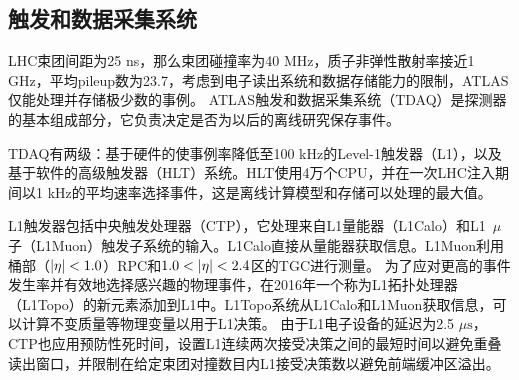 \subsection{触发和数据采集系统}
LHC束团间距为25 ns，那么束团碰撞率为40 MHz，质子非弹性散射率接近1 GHz，平均pileup数为23.7，考虑到电子读出系统和数据存储能力的限制，ATLAS仅能处理并存储极少数的事例。
ATLAS触发和数据采集系统（TDAQ）\cite{Aaboud2017}是探测器的基本组成部分，它负责决定是否为以后的离线研究保存事件。

TDAQ有两级：基于硬件的使事例率降低至100 kHz的Level-1触发器（L1），以及基于软件的高级触发器（HLT）系统。HLT使用4万个CPU，并在一次LHC注入期间以1 kHz的平均速率选择事件，这是离线计算模型和存储可以处理的最大值。

L1触发器包括中央触发处理器（CTP），它处理来自L1量能器（L1Calo）和L1~$\mu$子（L1Muon）触发子系统的输入。L1Calo直接从量能器获取信息。L1Muon利用桶部（$|\eta|<1.0$）RPC和$1.0<\abseta<2.4$区的TGC进行测量。
为了应对更高的事件发生率并有效地选择感兴趣的物理事件，在2016年一个称为L1拓扑处理器（L1Topo）\cite{Simioni:2014nha}的新元素添加到L1中。L1Topo系统从L1Calo和L1Muon获取信息，可以计算不变质量等物理变量以用于L1决策。
由于L1电子设备的延迟为2.5 $\mu\text{s}$，CTP也应用预防性死时间，设置L1连续两次接受决策之间的最短时间以避免重叠读出窗口，并限制在给定束团对撞数目内L1接受决策数以避免前端缓冲区溢出。

